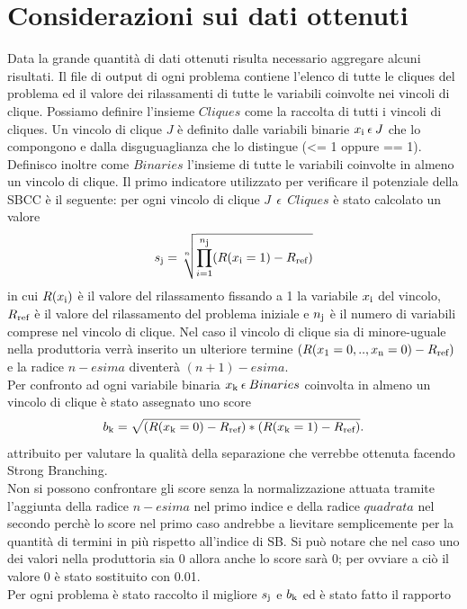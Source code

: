 \documentclass[12pt,a4paper,twoside,openright]{book}
\begin{document}
\section{Considerazioni sui dati ottenuti}
Data la grande quantità di dati ottenuti risulta necessario aggregare alcuni risultati. 
Il file di output di ogni problema contiene l'elenco di tutte le cliques del problema 
ed il valore dei rilassamenti di tutte le variabili coinvolte nei vincoli di clique. Possiamo
definire l'insieme $Cliques$ come la raccolta di tutti i vincoli di cliques. Un vincolo di clique
$J$ è definito dalle variabili binarie $x\textsubscript{i}\:\epsilon\:J$ che lo compongono e dalla disguguaglianza che lo distingue (<= 1 oppure == 1). 
Definisco inoltre come $Binaries$ l'insieme di tutte le variabili coinvolte in almeno un vincolo di clique.
Il primo indicatore utilizzato per verificare il potenziale della SBCC è il seguente: per ogni vincolo di clique 
$J\:\:\epsilon\:\:Cliques$ è stato calcolato un valore
\[ s\textsubscript{j} = \sqrt[n]{\prod_{i=1}^{n\textsubscript{j}} (R(x\textsubscript{i}=1)-R\textsubscript{ref}) }\] 
in cui $R(x\textsubscript{i})$ è il valore del rilassamento fissando a 1 la variabile $x\textsubscript{i}$
del vincolo, $R\textsubscript{ref}$ è il valore del rilassamento del problema iniziale e $n\textsubscript{j}$ è il 
numero di variabili comprese nel vincolo di clique. Nel caso il vincolo di clique sia di minore-uguale nella 
produttoria verrà inserito un ulteriore termine $(R(x\textsubscript{1}=0, .., x\textsubscript{n}=0)- R\textsubscript{ref})$ e la radice
$n-esima$ diventerà $(n+1)-esima$.\\
Per confronto ad ogni variabile binaria $x\textsubscript{k}\:\epsilon\:Binaries$ coinvolta in almeno un vincolo di clique è stato assegnato uno score
\[ b\textsubscript{k} = \sqrt{(R(x\textsubscript{k}=0)-R\textsubscript{ref})*(R(x\textsubscript{k}=1)-R\textsubscript{ref})}.\] attribuito per 
valutare la qualità della separazione che verrebbe ottenuta facendo Strong Branching.\\
Non si possono confrontare gli score senza la normalizzazione attuata tramite l'aggiunta della radice $n-esima$ nel primo indice
e della radice $quadrata$ nel secondo perchè lo score nel primo caso andrebbe a lievitare semplicemente per la quantità
di termini in più rispetto all'indice di SB. 
Si può notare che nel caso uno dei valori nella produttoria sia 0 allora anche lo score sarà 0; per ovviare a ciò il 
valore 0 è stato sostituito con 0.01.\\
Per ogni problema è stato raccolto il migliore $s\textsubscript{j}$ e $b\textsubscript{k}$ ed è stato fatto il rapporto
\end{document}
